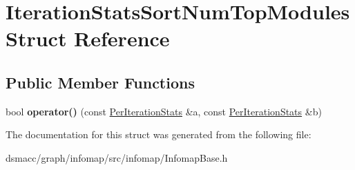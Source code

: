 \hypertarget{structIterationStatsSortNumTopModules}{}\section{Iteration\+Stats\+Sort\+Num\+Top\+Modules Struct Reference}
\label{structIterationStatsSortNumTopModules}
\subsection*{Public Member Functions}
\begin{DoxyCompactItemize}
\item 
\mbox{\label{structIterationStatsSortNumTopModules_a56926978572ae5b270d99e0149b936e1}} 
bool {\bfseries operator()} (const \mbox{\hyperlink{structPerIterationStats}{Per\+Iteration\+Stats}} \&a, const \mbox{\hyperlink{structPerIterationStats}{Per\+Iteration\+Stats}} \&b)
\end{DoxyCompactItemize}


The documentation for this struct was generated from the following file\+:\begin{DoxyCompactItemize}
\item 
dsmacc/graph/infomap/src/infomap/Infomap\+Base.\+h\end{DoxyCompactItemize}
